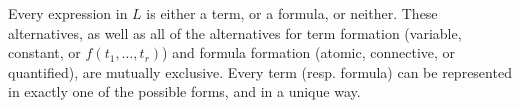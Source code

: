 Every expression in $L$ is either a term, or a formula, or neither. These alternatives, as well as all of the alternatives for term formation (variable, constant, or $f(t_1,\ldots,t_r)$) and formula formation (atomic, connective, or quantified), are mutually exclusive. Every term (resp. formula) can be represented in exactly one of the possible forms, and in a unique way.
